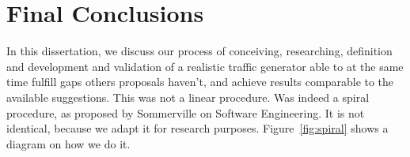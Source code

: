 




\section{Final Conclusions}


In this dissertation, we discuss our process of conceiving, researching, definition and development and validation of a realistic traffic generator able to at the same time fulfill gaps others proposals haven't, and achieve results comparable to the available suggestions. This was not a linear procedure. Was indeed a spiral procedure, as proposed by Sommerville on Software Engineering\cite{sommerville}. It is not identical, because we adapt it for research purposes. Figure~\ref{fig:spiral} shows a diagram on how we do it. 

